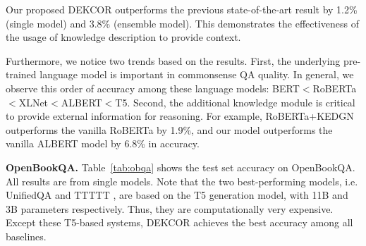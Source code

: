 \documentclass[11pt,a4paper]{article}
\begin{document}
Our proposed DEKCOR outperforms the previous state-of-the-art result by 1.2\% (single model) and 3.8\% (ensemble model). This demonstrates the effectiveness of the usage of knowledge description to provide context.

Furthermore, we notice two trends based on the results. First, the underlying pre-trained language model is important in commonsense QA quality. In general, we observe this order of accuracy among these language models: BERT$<$RoBERTa$<$XLNet$<$ALBERT$<$T5. Second, the additional knowledge module is critical to provide external information for reasoning. For example, RoBERTa+KEDGN outperforms the vanilla RoBERTa by 1.9\%, and our model outperforms the vanilla ALBERT model by 6.8\% in accuracy.

\noindent\textbf{OpenBookQA.} Table~\ref{tab:obqa} shows the test set accuracy on OpenBookQA. All results are from single models. Note that the two best-performing models, i.e. UnifiedQA \citep{unifiedqa} and TTTTT \citep{t5}, are based on the T5 generation model, with 11B and 3B parameters respectively. Thus, they are computationally very expensive. Except these T5-based systems, DEKCOR achieves the best accuracy among all baselines.
\end{document}
